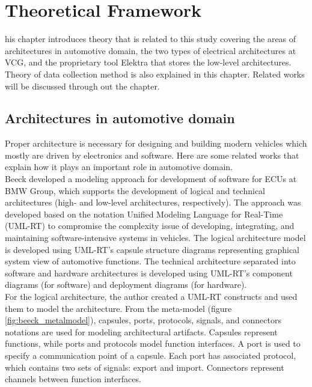 \chapter{Theoretical Framework}

\lettrine[findent=2pt]{}{ }his chapter introduces theory that is related to this study covering the areas of architectures in automotive domain, the two types of electrical architectures at VCG, and the proprietary tool Elektra that stores the low-level architectures. Theory of data collection method is also explained in this chapter. Related works will be discussed through out the chapter.

\section{Architectures in automotive domain}
Proper architecture is necessary for designing and building modern vehicles which mostly are driven by electronics and software. Here are some related works that explain how it plays an important role in automotive domain.\\

Beeck \cite{Beeck} developed a modeling approach for development of software for ECUs at BMW Group, which supports the development of logical and technical architectures (high- and low-level architectures, respectively). The approach was developed based on the notation Unified Modeling Language for Real-Time (UML-RT) to compromise the complexity issue of developing, integrating, and maintaining software-intensive systems in vehicles. The logical architecture model is developed using UML-RT's capsule structure diagrams representing graphical system view of automotive functions. The technical architecture separated into software and hardware architectures is developed using UML-RT's component diagrams (for software) and deployment diagrams (for hardware). \\

For the logical architecture, the author created a UML-RT constructs and used them to model the architecture. From the meta-model (figure \ref{fig:beeck_metalmodel}), capsules, ports, protocols, signals, and connectors notations are used for modeling architectural artifacts. Capsules represent functions, while ports and protocols model function interfaces. A port is used to specify a communication point of a capsule. Each port has associated protocol, which contains two sets of signals: export and import. Connectors represent channels between function interfaces. \\

